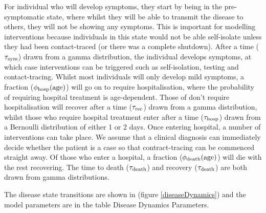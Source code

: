 \documentclass[11pt, oneside]{amsart}   	%
\begin{document}
For individual who will develop symptoms, they start by being in the pre-symptomatic state, where whilst they will be able to transmit the disease to others, they will not be showing any symptoms. 
This is important for modelling interventions because individuals in this state would not be able self-isolate unless they had been contact-traced (or there was a complete shutdown).
After a time ($\tau_{\rm sym}$) drawn from a gamma distribution, the individual develops symptoms, at which case interventions can be triggered such as self-isolation, testing and contact-tracing.
Whilst most individuals will only develop mild symptoms, a fraction ($\phi_{\rm hosp}({\rm age})$) will go on to require hospitalisation, where the probability of requiring hospital treatment is age-dependent.
Those of don't require hospitalisation will recover after a time ($\tau_{\rm rec}$) drawn from a gamma distribution, whilst those who require hospital treatment enter after a time ($\tau_{\rm hosp}$) drawn from a Bernoulli distribution of either 1 or 2 days.
Once entering hospital, a number of interventions can take place. 
We assume that a clinical diagnosis can immediately decide whether the patient is a case so that contract-tracing can be commenced straight away.
Of those who enter a hospital, a fraction ($\phi_{\rm death}({\rm age})$) will die with the rest recovering. 
The time to death ($\tau_{\rm death}$) and recovery ($\tau_{\rm death}$) are both drawn from gamma distributions.

The disease state transitions are shown in (figure \ref{diseaseDynamics}) and the model parameters are in the table Disease Dynamics Parameters.
\end{document}
